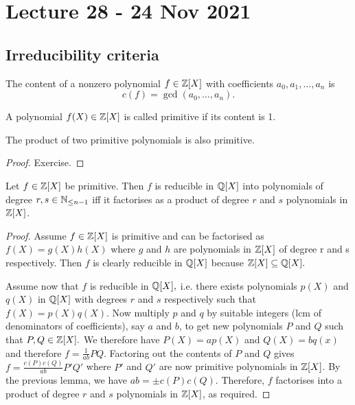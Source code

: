 \section{Lecture 28 - 24 Nov 2021}
\subsection{Irreducibility criteria}

\begin{definition}
    The content of a nonzero polynomial $f \in \mathbb Z[X]$ with coefficients $a_0, a_1, \ldots, a_n$ is
    $$
    c(f)=\gcd(a_0, \ldots, a_n).
    $$
\end{definition}

\begin{definition}
  A polynomial $f(X) \in \mathbb Z[X]$ is called primitive if its content is 1.
  \label{def:primitivePol}
\end{definition}
\begin{lemma}
    The product of two primitive polynomials is also primitive.
\end{lemma}
\begin{proof}
    Exercise.
\end{proof}
\begin{theorem}
  Let $f\in \mathbb Z[X]$ be primitive. Then $f$ is reducible in $\mathbb Q[X]$ into polynomials of
  degree $r,s\in \mathbb N_{\leq n-1}$ iff it factorises as a product of degree $r$ and $s$
  polynomials in $\mathbb Z[X]$.
  \label{thm:GaussLemmaPol}
\end{theorem}
\begin{proof}
  Assume $f\in\mathbb Z[X]$ is primitive and can be factorised as $f(X)=g(X)h(X)$ where $g$ and $h$ are polynomials in $\mathbb Z[X]$ of degree r and s respectively. Then $f$ is clearly reducible in $\mathbb Q[X]$ because $\mathbb Z[X]\subseteq\mathbb Q[X].$
  
  Assume now that $f$ is reducible in $\mathbb Q[X],$ i.e. there exists polynomials $p(X)$ and $q(X)$ in $\mathbb Q[X]$ with degrees $r$ and $s$ respectively such that $f(X)=p(X)q(X).$ Now multiply $p$ and $q$ by suitable integers (lcm of denominators of coefficients), say $a$ and $b$, to get new polynomials $P$ and $Q$ such that $P,Q\in \mathbb Z[X].$ We therefore have $P(X)=ap(X)$ and $Q(X)=bq(x)$ and therefore $f=\frac{1}{ab} PQ.$ Factoring out the contents of $P$ and $Q$ gives $f=\frac{c(P)c(Q)}{ab}P'Q'$ where $P'$ and $Q'$ are now primitive polynomials in $\mathbb Z[X]$. By the previous lemma, we have $ab=\pm c(P)c(Q).$ Therefore, $f$ factorises into a product of degree $r$ and $s$ polynomials in $\mathbb Z[X]$, as required.
\end{proof}

